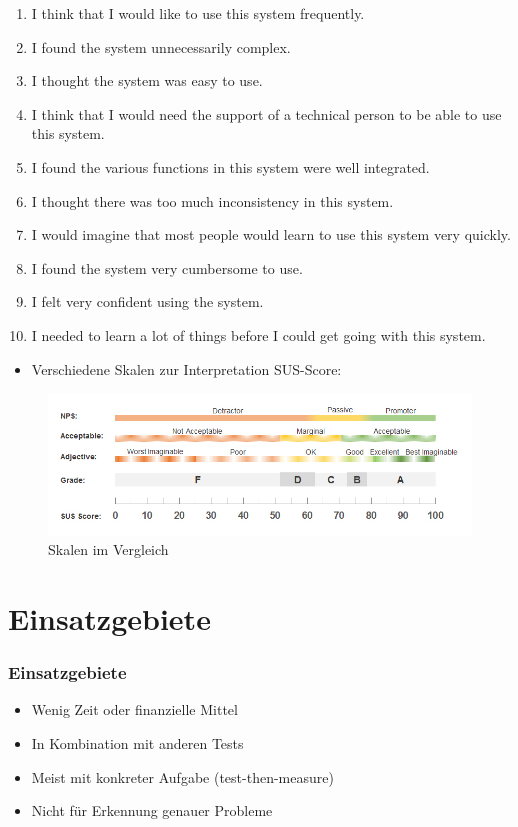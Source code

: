 \documentclass[12pt, aspectratio=169]{beamer}
\begin{document}
\begin{frame}
	\begin{enumerate}
		\item <1> I think that I would like to use this system frequently.
		\item <1> I found the system unnecessarily complex.
		\item <1> I thought the system was easy to use.
		\item <1> I think that I would need the support of a technical person to be able to use this system.
		\item <1> I found the various functions in this system were well integrated.
		\item <1> I thought there was too much inconsistency in this system.
		\item <1> I would imagine that most people would learn to use this system very quickly.
		\item <1> I found the system very cumbersome to use.
		\item <1> I felt very confident using the system.
		\item <1> I needed to learn a lot of things before I could get going with this system.
	\end{enumerate}
\end{frame}

\begin{frame}
	\vspace*{20px}
	\begin{itemize}
		\item <1> Verschiedene Skalen zur Interpretation SUS-Score:
	\end{itemize}
	\begin{figure}
		\centering
		\includegraphics[keepaspectratio=true, width=\textwidth]{./image/sus-scale-adj.jpg}
		\caption{Skalen im Vergleich\tiny{\cite{pic3}}}
	\end{figure}
\end{frame}


\section{Einsatzgebiete}
\begin{frame}
	\frametitle{Einsatzgebiete}
	\begin{itemize}
		\item<1> Wenig Zeit oder finanzielle Mittel
		\item<1> In Kombination mit anderen Tests
		\item<1> Meist mit konkreter Aufgabe (test-then-measure)
		\item<1> Nicht für Erkennung genauer Probleme
	\end{itemize}
\end{frame}
\end{document}
